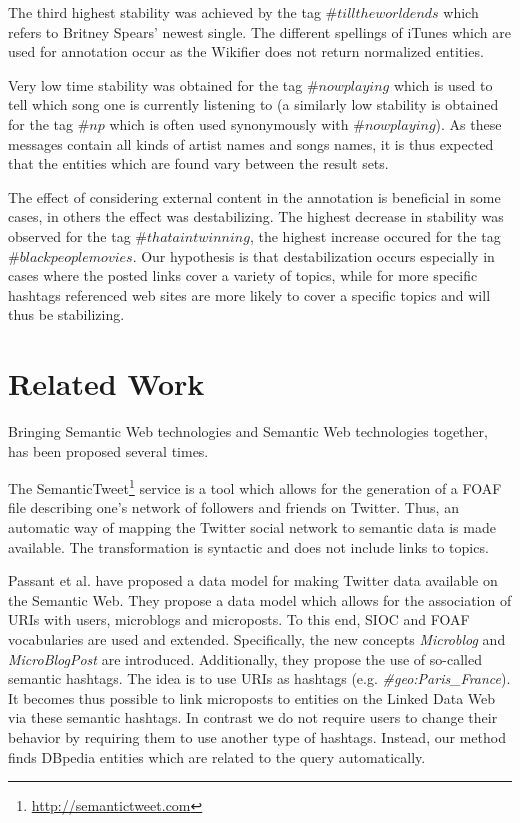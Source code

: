 \documentclass{llncs}
\begin{document}
The third highest stability was achieved by the tag $\#tilltheworldends$ which refers to Britney Spears' newest single. The different spellings of iTunes which are used for annotation occur as the Wikifier does not return normalized entities.

Very low time stability was obtained for the tag $\#nowplaying$ which is used to tell which song one is currently listening to (a similarly low stability is obtained for the tag $\#np$ which is often used synonymously with $\#nowplaying$). As these messages contain all kinds of artist names and songs names, it is thus expected that the entities which are found vary between the result sets.

The effect of considering external content in the annotation is beneficial in some cases, in others the effect was destabilizing. The highest decrease in stability was observed for the tag $\#thataintwinning$, the highest increase occured for the tag $\#blackpeoplemovies$. Our hypothesis is that destabilization occurs especially in cases where the posted links cover a variety of topics, while for more specific hashtags referenced web sites are more likely to cover a specific topics and will thus be stabilizing.

\section{Related Work}
\label{sect:relWork}

Bringing Semantic Web technologies and Semantic Web technologies together, has been proposed several times.

The SemanticTweet\footnote{\url{http://semantictweet.com}} service is a tool which allows for the generation of a FOAF file describing one's network of followers and friends on Twitter. Thus, an automatic way of mapping the Twitter social network to semantic data is made available. The transformation is syntactic and does not include links to topics.

Passant et al. \cite{key:smob} have proposed a data model for making Twitter data available on the Semantic Web. They propose a data model which allows for the association of URIs with users, microblogs and microposts. To this end, SIOC and FOAF vocabularies are used and extended. Specifically, the new concepts \emph{Microblog} and \emph{MicroBlogPost} are introduced. Additionally, they propose the use of so-called semantic hashtags. The idea is to use URIs as hashtags (e.g. \emph{\#geo:Paris\_France}). It becomes thus possible to link microposts to entities on the Linked Data Web via these semantic hashtags. 
In contrast we do not require users to change their behavior by requiring them to use another type of hashtags. Instead, our method finds DBpedia entities which are related to the query automatically.
\end{document}
